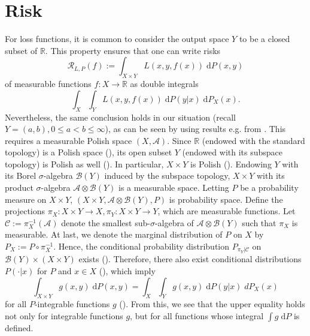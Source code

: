 \documentclass[10pt]{article}
\newcommand{\R}{\mathbb{R}}
\newcommand{\XY}{X \times Y}
\newcommand{\B}  {\mathcal{B}}   %
\newcommand{\AB}{\mathcal{A} \otimes \mathcal{B}}
\newcommand{\dd}{\mathrm{d}}
\begin{document}
\section{Risk} \label{Kap_Risiko}
For loss functions, it is common to consider the output space $Y$ to be a closed subset of $\R$.
This property ensures that one can write risks
\begin{equation*}
	\mathcal{R}_{L, P}(f) := \int_{X \times Y} L(x,y,f(x)) \; \mathrm{d}P(x,y)
\end{equation*}
of measurable functions $f: X \to \R$ as double integrals
\begin{equation*}
	\int_X \int_Y L(x,y,f(x)) \; \mathrm{d}P(y|x) \; \dd P_X(x).
\end{equation*}
Nevertheless, the same conclusion holds in our situation (recall $Y = (a,b), 0 \leq a < b \leq \infty$), as can be seen by using results e.g. from \cites[Chapter 26]{Bauer2001}[Chapter 8]{Cohn2013}[Chapter 10]{Dudley2002}.
This requires a measurable Polish space $(X, \mathcal{A})$.
Since $\R$ (endowed with the standard topology) is a Polish space (\cites[Chapter 26, p. 157]{Bauer2001}[Ex. 8.1.1 (a)]{Cohn2013}), its open subset $Y$ (endowed with its subspace topology) is Polish as well (\cites[Chapter 26, p. 157]{Bauer2001}[Prop. 8.1.2]{Cohn2013}).
In particular, $\XY$ is Polish (\cites[Chapter 26, p. 157]{Bauer2001}[Prop. 8.1.4]{Cohn2013}).
Endowing $Y$ with its Borel $\sigma$-algebra $\B(Y)$ induced by the subspace topology, $\XY$ with its product $\sigma$-algebra $\AB(Y)$ is a measurable space.
Letting $P$ be a probability measure on $\XY$, $(X \times Y, \AB(Y), P)$ is probability space.
Define the projections
$\pi_X: X \times Y \to X, 	\pi_Y: X \times Y \to Y$, which are measurable functions.
Let $\mathcal{C} := \pi_X^{-1}(\mathcal{A})$ denote the smallest sub-$\sigma$-algebra of $\AB(Y)$ such that $\pi_X$ is measurable.
At last, we denote the marginal distribution of $P$ on $X$ by $P_X := P \circ \pi_X^{-1}$.
Hence, the conditional probability distribution $P_{\pi_{Y} | \mathcal{C}}$ on $\mathcal{B}(Y) \times (X \times Y)$ exists (\cite[Thm. 10.2.2]{Dudley2002}).
Therefore, there also exist conditional distributions $P(\cdot | x)$ for $P$ and $x \in X$ (\cite[Thm. 10.2.1 (I)]{Dudley2002}),
which imply
\begin{equation*}
	\int_{X \times Y} g(x,y) \; \mathrm{d}P(x,y) = \int_X \int_Y g(x,y) \; \mathrm{d}P(y|x) \; dP_X(x)
\end{equation*}
for all $P$-integrable functions $g$ (\cite[Thm. 10.2.1 (II)]{Dudley2002}). 
From this, we see that the upper equality holds not only for integrable functions $g$, but for all functions whose integral $\int g \; \mathrm{d}P$ is defined.
\end{document}
